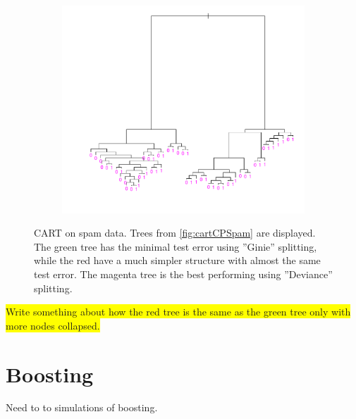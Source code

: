 \begin{figure}[h!]
  \begin{subfigure}[b]{0.48\textwidth}
    \includegraphics[width=\textwidth]{./figures/cartOptDevianceSpam.pdf}
  \end{subfigure}
  \vspace{1\baselineskip}
  \caption{CART on spam data. Trees from \ref{fig:cartCPSpam} are displayed. The green tree has the minimal test error using ''Ginie'' splitting, while the red have a much simpler structure with almost the same test error. The magenta tree is the best performing using ''Deviance'' splitting.}
  \label{fig:CartSpam}
\end{figure}
\colorbox{yellow}{Write something about how the red tree is the same as the green tree only with more nodes collapsed.}\\




\section{Boosting}
\label{sec:SimBoosting}
Need to to simulations of boosting.
